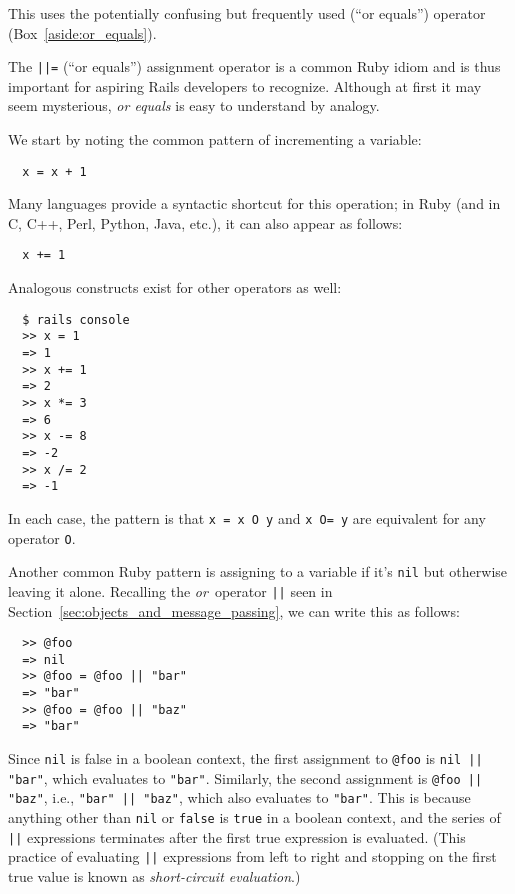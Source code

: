 \noindent This uses the potentially confusing but frequently used \kode{||=} (``or equals'') operator (Box~\ref{aside:or_equals}).


\begin{aside}
\label{aside:or_equals}

The \texttt{||=} (``or equals'') assignment operator is a common Ruby idiom and is thus important for aspiring Rails developers to recognize. Although at first it may seem mysterious, \emph{or equals} is easy to understand by analogy.

We start by noting the common pattern of incrementing a variable:

\begin{verbatim}
  x = x + 1
\end{verbatim}

\noindent Many languages provide a syntactic shortcut for this operation; in Ruby (and in C, C++, Perl, Python, Java, etc.), it can also appear as follows:

\begin{verbatim}
  x += 1
\end{verbatim}

\noindent Analogous constructs exist for other operators as well:

\begin{verbatim}
  $ rails console
  >> x = 1
  => 1
  >> x += 1
  => 2
  >> x *= 3
  => 6
  >> x -= 8
  => -2
  >> x /= 2
  => -1
\end{verbatim}

\noindent In each case, the pattern is that \texttt{x = x O y} and \texttt{x O= y} are equivalent for any operator \texttt{O}.

Another common Ruby pattern is assigning to a variable if it's \texttt{nil} but otherwise leaving it alone. Recalling the \emph{or}~operator \texttt{||} seen in Section~\ref{sec:objects_and_message_passing}, we can write this as follows:

\begin{verbatim}
  >> @foo
  => nil
  >> @foo = @foo || "bar"
  => "bar"
  >> @foo = @foo || "baz"
  => "bar"
\end{verbatim}

\noindent Since \texttt{nil} is false in a boolean context, the first assignment to \texttt{@foo} is \texttt{nil || "bar"}, which evaluates to \texttt{"bar"}. Similarly, the second assignment is \texttt{@foo || "baz"}, i.e., \texttt{"bar" || "baz"}, which also evaluates to \texttt{"bar"}. This is because anything other than \texttt{nil} or \texttt{false} is \texttt{true} in a boolean context, and the series of \texttt{||} expressions terminates after the first true expression is evaluated. (This practice of evaluating \texttt{||} expressions from left to right and stopping on the first true value is known as \emph{short-circuit evaluation}.)


\end{aside}
